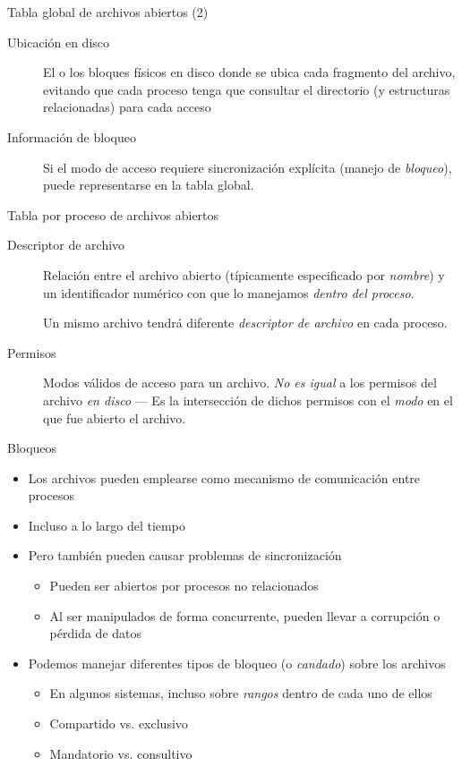 \documentclass[presentation]{beamer}
\begin{document}
\begin{frame}[label={sec:orgcf650ce}]{Tabla global de archivos abiertos (2)}
\begin{description}
\item[{Ubicación en disco}] El o los bloques físicos en disco donde se
ubica cada fragmento del archivo, evitando que cada proceso tenga
que consultar el directorio (y estructuras relacionadas) para
cada acceso
\item[{Información de bloqueo}] Si el modo de acceso requiere
sincronización explícita (manejo de \emph{bloqueo}), puede
representarse en la tabla global.
\end{description}
\end{frame}

\begin{frame}[label={sec:org632abb2}]{Tabla por proceso de archivos abiertos}
\begin{description}
\item[{Descriptor de archivo}] Relación entre el archivo abierto
(típicamente especificado por \emph{nombre}) y un identificador
numérico con que lo manejamos \emph{dentro del proceso}.

Un mismo archivo tendrá diferente \emph{descriptor de archivo} en
cada proceso.

\item[{Permisos}] Modos válidos de acceso para un archivo. \emph{No es igual}
a los permisos del archivo \emph{en disco} — Es la
intersección de dichos permisos con el \emph{modo} en el que
fue abierto el archivo.
\end{description}
\end{frame}

\begin{frame}[label={sec:org0da5340}]{Bloqueos}
\begin{itemize}
\item Los archivos pueden emplearse como mecanismo de comunicación entre
procesos
\item Incluso a lo largo del tiempo
\item Pero también pueden causar problemas de sincronización
\begin{itemize}
\item Pueden ser abiertos por procesos no relacionados
\item Al ser manipulados de forma concurrente, pueden llevar a
corrupción o pérdida de datos
\end{itemize}
\item Podemos manejar diferentes tipos de bloqueo (o \emph{candado}) sobre los
archivos
\begin{itemize}
\item En algunos sistemas, incluso sobre \emph{rangos} dentro de cada uno de
ellos
\item Compartido vs. exclusivo
\item Mandatorio vs. consultivo
\end{itemize}
\end{itemize}
\end{frame}
\end{document}
